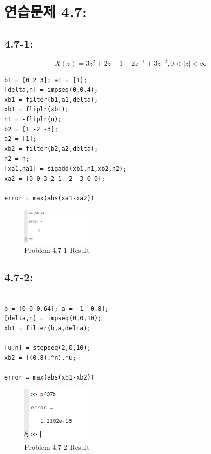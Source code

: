 \documentclass[11pt
  , a4paper
  , article
  , oneside
]{memoir}
\begin{document}
\chapter{연습문제 4.7: }
\section{4.7-1: }
\begin {equation}
X(z) = 3z^2+2z+1-2z^{-1}+3z^{-2}, 0 < |z| < \infty
\end {equation}

\begin{lstlisting}[style=termstyle]
%Problem 4.7-1
b1 = [0 2 3]; a1 = [1]; 
[delta,n] = impseq(0,0,4);
xb1 = filter(b1,a1,delta); 
xb1 = fliplr(xb1); 
n1 = -fliplr(n);
b2 = [1 -2 -3]; 
a2 = [1]; 
xb2 = filter(b2,a2,delta); 
n2 = n;
[xa1,na1] = sigadd(xb1,n1,xb2,n2); 
xa2 = [0 0 3 2 1 -2 -3 0 0];

error = max(abs(xa1-xa2))
\end{lstlisting}

\begin{figure}[h!]
	\centering
	\includegraphics[width=0.3\textwidth,height=0.1\textwidth]{./images/p407a.png}
	\caption{Problem 4.7-1 Result}
	\label{fig:Problem 4.7-1 Result}
\end{figure}

\section{4.7-2: }
\begin{lstlisting}[style=termstyle]
%Problem 4.7-2

b = [0 0 0.64]; a = [1 -0.8]; 
[delta,n] = impseq(0,0,10);
xb1 = filter(b,a,delta);

[u,n] = stepseq(2,0,10); 
xb2 = ((0.8).^n).*u;

error = max(abs(xb1-xb2))
\end{lstlisting}

\begin{figure}[h!]
	\centering
	\includegraphics[width=0.3\textwidth,height=0.1\textwidth]{./images/p407b.png}
	\caption{Problem 4.7-2 Result}
	\label{fig:Problem 4.7-2 Result}
\end{figure}
\end{document}
